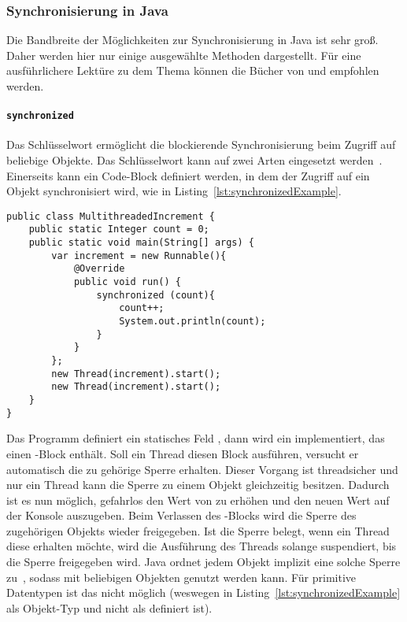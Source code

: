 \subsubsection{Synchronisierung in Java}
Die Bandbreite der Möglichkeiten zur Synchronisierung in Java ist sehr groß. Daher werden hier nur einige ausgewählte Methoden dargestellt. Für eine ausführlichere Lektüre zu dem Thema können die Bücher von \textcite{Friesen2015} und \textcite{Hettel2016} empfohlen werden.

\paragraph{\texttt{synchronized}} Das Schlüsselwort  ermöglicht die blockierende Synchronisierung beim Zugriff auf beliebige Objekte. Das Schlüsselwort kann auf zwei Arten eingesetzt werden~\Cite[S.~339~ff.]{Rauber2006}. Einerseits kann ein Code-Block definiert werden, in dem der Zugriff auf ein Objekt synchronisiert wird, wie in Listing~\ref{lst:synchronizedExample}.
\begin{lstlisting}[caption={[Beispiel eines Java-\glsentryuseri{Programm} mit Nutzung von \code{synchronized}.]Beispiel eines Java-\glsuseri{Programm}, das \code{synchronized} zur Synchronisierung nebenläufiger \glspl{Anweisung} nutzt.}, label={lst:synchronizedExample},float={htbp}]
public class MultithreadedIncrement {
	public static Integer count = 0;
	public static void main(String[] args) {
		var increment = new Runnable(){
			@Override
			public void run() {
				synchronized (count){
					count++;
					System.out.println(count);
				}
			}
		};
		new Thread(increment).start();
		new Thread(increment).start();
	}
}	
\end{lstlisting}
Das \gls{Programm} definiert ein statisches Feld , dann wird ein \classRunnable{} implementiert, das einen -Block enthält. Soll ein Thread diesen Block ausführen, versucht er automatisch die zu  gehörige Sperre erhalten. Dieser Vorgang ist threadsicher und nur ein Thread kann die Sperre zu einem Objekt gleichzeitig besitzen. Dadurch ist es nun möglich, gefahrlos den Wert von  zu erhöhen und den neuen Wert auf der Konsole auszugeben. Beim Verlassen des -Blocks wird die Sperre des zugehörigen Objekts wieder freigegeben. Ist die Sperre belegt, wenn ein Thread diese erhalten möchte, wird die Ausführung des Threads solange suspendiert, bis die Sperre freigegeben wird. Java ordnet jedem Objekt implizit eine solche Sperre zu~\cite{Friesen2015}, sodass  mit beliebigen Objekten genutzt werden kann. Für primitive Datentypen ist das nicht möglich (weswegen  in Listing~\ref{lst:synchronizedExample} als Objekt-Typ \classInteger{} und nicht als  definiert ist).

